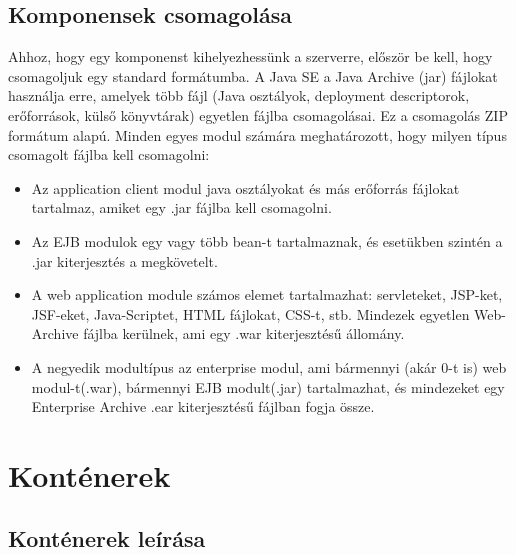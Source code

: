 \documentclass[centeredchapter]{thesis-ekf}
\theoremstyle{definition}
\theoremstyle{remark}
\begin{document}
\subsection{Komponensek csomagolása}

Ahhoz, hogy egy komponenst kihelyezhessünk a szerverre, először be kell, hogy csomagoljuk egy standard formátumba. A Java SE a Java Archive (jar) fájlokat használja erre, amelyek több fájl (Java osztályok, deployment descriptorok, erőforrások, külső könyvtárak) egyetlen fájlba csomagolásai. Ez a csomagolás ZIP formátum alapú.
Minden egyes modul számára meghatározott, hogy milyen típus csomagolt fájlba kell csomagolni:\cite{BJEE}
\begin{itemize}
	\item Az application client modul java osztályokat és más erőforrás fájlokat tartalmaz, amiket egy .jar fájlba kell csomagolni.
	
	\item Az EJB modulok egy vagy több bean-t tartalmaznak, és esetükben szintén a .jar kiterjesztés a megkövetelt.
	
	\item A web application module számos elemet tartalmazhat: servleteket, JSP-ket, JSF-eket, Java-Scriptet, HTML fájlokat, CSS-t, stb. Mindezek egyetlen Web-Archive fájlba kerülnek, ami egy .war kiterjesztésű állomány.
	
	\item A negyedik modultípus az enterprise modul, ami bármennyi (akár 0-t is) web modul-t(.war), bármennyi EJB modult(.jar) tartalmazhat, és mindezeket egy Enterprise Archive .ear kiterjesztésű fájlban fogja össze.
	
\end{itemize} 

\section{Konténerek}

\subsection{Konténerek leírása}
\end{document}
